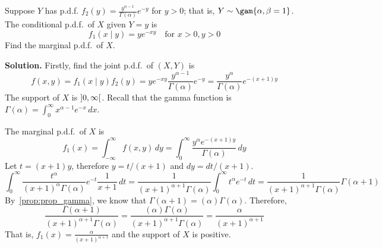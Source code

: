 \begin{Example}{}{}
    Suppose $ Y $ has p.d.f. $ \displaystyle f_2(y)=\frac{y^{\alpha-1}}{\Gamma(\alpha)}e^{-y} $
    for $ y>0 $; that is, $ Y \sim \gam{\alpha,\beta=1}$. The conditional
    p.d.f.\ of $ X $ given $ Y=y $ is
    \[ f_1(x\mid y)=ye^{-xy}\quad\text{for }x>0,y>0 \]
    Find the marginal p.d.f.\ of $ X $.

    \textbf{Solution.} Firstly, find the joint p.d.f.\ of $ (X,Y) $ is
    \[
        f(x,y)
        =f_1(x\mid y)f_2(y)
        =ye^{-x y} \frac{y^{\alpha-1}}{\Gamma(\alpha)}e^{-y}
        =\frac{y^{\alpha}}{\Gamma(\alpha)} e^{-(x+1)y}\]
    The support of $ X $ is $ \ointerval{0}{\infty} $. Recall that
    the gamma function is
    $ \displaystyle  \Gamma(\alpha)=\int_{0}^{\infty} x^{\alpha-1}e^{-x}\, d{x} $.

    The marginal p.d.f.\ of $ X $ is
    \[
        f_1(x)=\int_{-\infty}^{\infty} f(x,y)\, d{y}
        =\int_{0}^{\infty} \frac{y^\alpha e^{-(x+1)y}}{\Gamma(\alpha)} \, d{y} \]
    Let $ t=(x+1)y $, therefore $ y=t/(x+1) $ and $ dy=dt/(x+1) $.
    \[ \int_{0}^{\infty} \frac{t^\alpha}{(x+1)^\alpha \Gamma(\alpha)}e^{-t}\frac{1}{x+1} \, d{t}
        =\frac{1}{(x+1)^{\alpha+1}\Gamma(\alpha)}
        \int_{0}^{\infty} t^{\alpha}e^{-t}\, d{t}=
        \frac{1}{(x+1)^{\alpha+1}\Gamma(\alpha)}\Gamma(\alpha+1)  \]
    By~\ref{prop:prop_gamma}, we know that $ \Gamma(\alpha+1) =(\alpha)\Gamma(\alpha) $.
    Therefore,
    \[ \frac{\Gamma(\alpha+1)}{(x+1)^{\alpha+1}\Gamma(\alpha)}=
        \frac{(\alpha)\Gamma(\alpha)}{(x+1)^{\alpha+1}\Gamma(\alpha)}=
        \frac{\alpha}{(x+1)^{\alpha+1}} \]
    That is, $ \displaystyle  f_1(x)=\frac{\alpha}{(x+1)^{\alpha+1}} $
    and the support of $ X $ is positive.
\end{Example}

